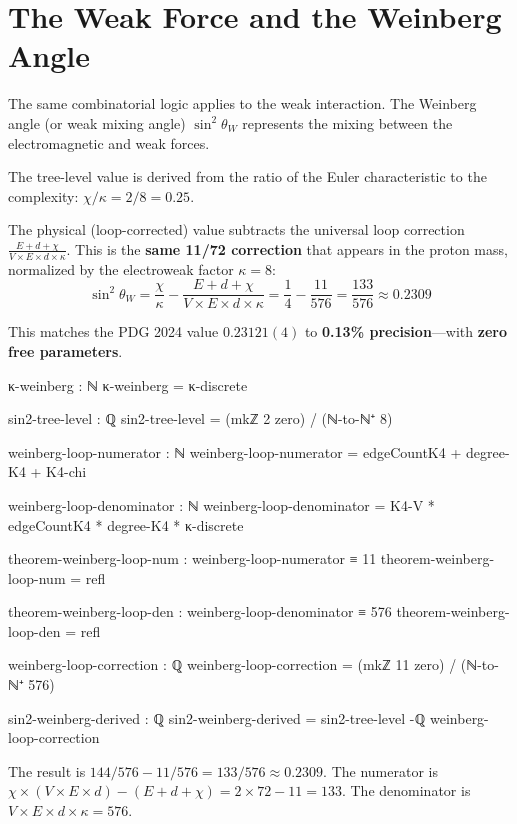 \documentclass[11pt,a4paper]{book}
\begin{document}
\section{The Weak Force and the Weinberg Angle}

The same combinatorial logic applies to the weak interaction. The Weinberg angle (or weak mixing angle) $\sin^2 \theta_W$ represents the mixing between the electromagnetic and weak forces.

The tree-level value is derived from the ratio of the Euler characteristic to the complexity: $\chi/\kappa = 2/8 = 0.25$.

The physical (loop-corrected) value subtracts the universal loop correction $\frac{E + d + \chi}{V \times E \times d \times \kappa}$. This is the \textbf{same 11/72 correction} that appears in the proton mass, normalized by the electroweak factor $\kappa = 8$:
\[
\sin^2\theta_W = \frac{\chi}{\kappa} - \frac{E + d + \chi}{V \times E \times d \times \kappa} = \frac{1}{4} - \frac{11}{576} = \frac{133}{576} \approx 0.2309
\]

This matches the PDG 2024 value $0.23121(4)$ to \textbf{0.13\% precision}---with \textbf{zero free parameters}.

\begin{code}
κ-weinberg : ℕ  
κ-weinberg = κ-discrete

sin2-tree-level : ℚ
sin2-tree-level = (mkℤ 2 zero) / (ℕ-to-ℕ⁺ 8)

weinberg-loop-numerator : ℕ
weinberg-loop-numerator = edgeCountK4 + degree-K4 + K4-chi

weinberg-loop-denominator : ℕ
weinberg-loop-denominator = K4-V * edgeCountK4 * degree-K4 * κ-discrete

theorem-weinberg-loop-num : weinberg-loop-numerator ≡ 11
theorem-weinberg-loop-num = refl

theorem-weinberg-loop-den : weinberg-loop-denominator ≡ 576
theorem-weinberg-loop-den = refl

weinberg-loop-correction : ℚ
weinberg-loop-correction = (mkℤ 11 zero) / (ℕ-to-ℕ⁺ 576)

sin2-weinberg-derived : ℚ
sin2-weinberg-derived = sin2-tree-level -ℚ weinberg-loop-correction
\end{code}

The result is $144/576 - 11/576 = 133/576 \approx 0.2309$.
The numerator is $\chi \times (V \times E \times d) - (E + d + \chi) = 2 \times 72 - 11 = 133$.
The denominator is $V \times E \times d \times \kappa = 576$.
\end{document}
